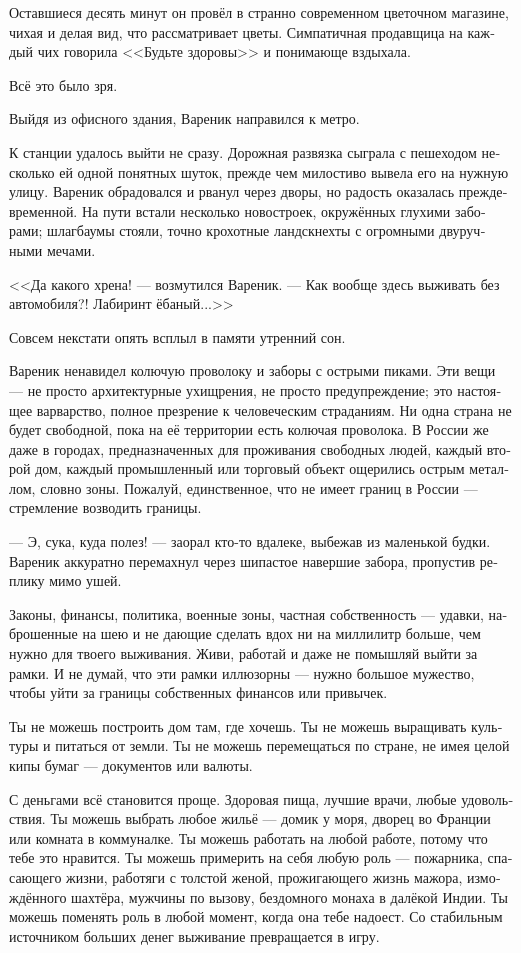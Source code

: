 \documentclass[a5paper,12pt,fleqn]{extbook}\usepackage{cooltooltips}\usepackage{polyglossia}\setdefaultlanguage[babelshorthands=true]{russian}\setotherlanguage{english}\defaultfontfeatures{Ligatures=TeX,Mapping=tex-text} \usepackage{xcolor}\definecolor{lightgray}{HTML}{bbbbbb}\color{lightgray}\newcommand{\ml}[3]{\textenglish{\textcolor{black}{#3}}}
\newcommand{\asterism}{\vspace{1em}{\centering\Large\bfseries$\ast~\ast~\ast$\par}\vspace{1em}}
\begin{document}
Оставшиеся десять минут он провёл в странно современном цветочном магазине, чихая и делая вид, что рассматривает цветы.
Симпатичная продавщица на каждый чих говорила <<Будьте здоровы>> и понимающе вздыхала.

Всё это было зря.

\asterism

Выйдя из офисного здания, Вареник направился к метро.

К станции удалось выйти не сразу.
Дорожная развязка сыграла с пешеходом несколько ей одной понятных шуток, прежде чем милостиво вывела его на нужную улицу.
Вареник обрадовался и рванул через дворы, но радость оказалась преждевременной.
На пути встали несколько новостроек, окружённых глухими заборами;
шлагбаумы стояли, точно крохотные ландскнехты с огромными двуручными мечами.

<<Да какого хрена! --- возмутился Вареник.
--- Как вообще здесь выживать без автомобиля?!
Лабиринт ёбаный...>>

Совсем некстати опять всплыл в памяти утренний сон.

Вареник ненавидел колючую проволоку и заборы с острыми пиками.
Эти вещи --- не просто архитектурные ухищрения, не просто предупреждение;
это настоящее варварство, полное презрение к человеческим страданиям.
Ни одна страна не будет свободной, пока на её территории есть колючая проволока.
В России же даже в городах, предназначенных для проживания свободных людей, каждый второй дом, каждый промышленный или торговый объект ощерились острым металлом, словно зоны.
Пожалуй, единственное, что не имеет границ в России --- стремление возводить границы.

--- Э, сука, куда полез! --- заорал кто-то вдалеке, выбежав из маленькой будки.
Вареник аккуратно перемахнул через шипастое навершие забора, пропустив реплику мимо ушей.

Законы, финансы, политика, военные зоны, частная собственность --- удавки, наброшенные на шею и не дающие сделать вдох ни на миллилитр больше, чем нужно для твоего выживания.
Живи, работай и даже не помышляй выйти за рамки.
И не думай, что эти рамки иллюзорны --- нужно большое мужество, чтобы уйти за границы собственных финансов или привычек.

Ты не можешь построить дом там, где хочешь.
Ты не можешь выращивать культуры и питаться от земли.
Ты не можешь перемещаться по стране, не имея целой кипы бумаг --- документов или валюты.

С деньгами всё становится проще.
Здоровая пища, лучшие врачи, любые удовольствия.
Ты можешь выбрать любое жильё --- домик у моря, дворец во Франции или комната в коммуналке.
Ты можешь работать на любой работе, потому что тебе это нравится.
Ты можешь примерить на себя любую роль --- пожарника, спасающего жизни, работяги с толстой женой, прожигающего жизнь мажора, измождённого шахтёра, мужчины по вызову, бездомного монаха в далёкой Индии.
Ты можешь поменять роль в любой момент, когда она тебе надоест.
Со стабильным источником больших денег выживание превращается в игру.
\end{document}
